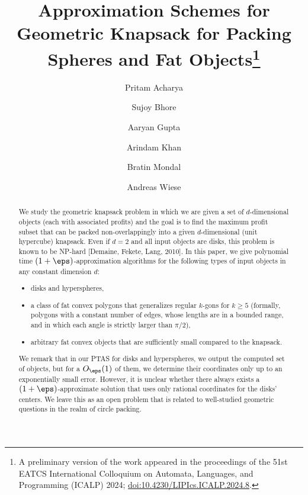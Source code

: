 \documentclass[a4paper, thm-restate, cleveref]{lipics-v2021}
\title{Approximation Schemes for Geometric Knapsack for Packing Spheres and Fat Objects\thanks{A preliminary version of the work appeared in the proceedings of the 51st EATCS International Colloquium on Automata, Languages, and Programming (ICALP) 2024; \href{https://doi.org/10.4230/LIPIcs.ICALP.2024.8}{doi:10.4230/LIPIcs.ICALP.2024.8}.}} %
\author{Pritam Acharya}{Department of Mathematics, Indian Institute of Science Education and Research Pune, India}{pritam.acharya@students.iiserpune.ac.in}{}{}%
\author{Sujoy Bhore}{Department of Computer Science and Engineering, Indian Institute of Technology Bombay, India}{sujoy@cse.iitb.ac.in}{}{}
\author{Aaryan Gupta}{Department of Computer Science and Engineering, Indian Institute of Technology Bombay, India}{aaryanguptaxyz@gmail.com}{}{}
\author{Arindam Khan}{Department of Computer Science and Automation, Indian Institute of Science Bengaluru, India}{arindamkhan@iisc.ac.in}{}{}
\author{Bratin Mondal}{Department of Computer Science and Engineering, Indian Institute of Technology Kharagpur, India}{mondalbratin2003@kgpian.iitkgp.ac.in}{}{}
\author{Andreas Wiese}{Department of Mathematics, Technical University of Munich, Germany}{andreas.wiese@tum.de}{}{}
\theoremstyle{plain}
\theoremstyle{plain}
\theoremstyle{plain}
\theoremstyle{definition}
\begin{document}
\maketitle

\begin{abstract}
We study the geometric knapsack problem in which we are given a set of $d$-dimensional objects (each with associated profits) and the goal is to find the maximum profit subset that can be packed non-overlappingly into a given $d$-dimensional (unit hypercube) knapsack.
Even if $d=2$ and all input objects are disks, this problem is known to be \textsf{NP}-hard [Demaine, Fekete, Lang, 2010].
In this paper, we give polynomial time $(1+\eps)$-approximation algorithms for the following types of input objects in any constant dimension $d$:
\begin{itemize}
 \item disks and hyperspheres,
 \item a class of fat convex polygons that generalizes regular $k$-gons for $k\ge 5$ (formally, polygons
 with a constant number of edges, whose lengths are in a bounded range, and in which each angle is strictly larger than $\pi/2$),
 \item arbitrary fat convex objects that are sufficiently small compared to the knapsack.%
\end{itemize}
We remark that in our \textsf{PTAS} for disks and hyperspheres, we output the computed set of objects, but for a $O_\eps(1)$ of them, we determine their coordinates only up to an exponentially small error. However, it is unclear whether there always exists a $(1+\eps)$-approximate solution that uses only rational coordinates for the disks' centers. We leave this as an open problem that is related to well-studied geometric questions in the realm of circle packing.

\end{abstract}











%


% 

%


\appendix


%


%
\end{document}
